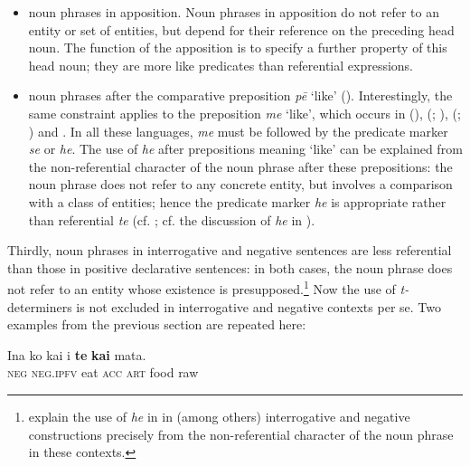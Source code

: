 \begin{itemize}
\item 
noun phrases in apposition. Noun phrases in apposition do not refer to an entity or set of entities, but depend for their reference on the preceding head noun. The function of the apposition is to specify a further property of this head noun; they are more like predicates than referential expressions.

\item 
noun phrases after the comparative preposition \textit{pē} ‘like’ (). Interestingly, the same constraint applies to the preposition \textit{me} ‘like’, which occurs in  (\citealt[136–137]{Cablitz2006}),  (\citealt[53]{Cook1999}; \citealt[156]{ElbertPukui1979}),  (\citealt[237]{Polinsky1992}; \citealt[356]{Bauer1993}) and  \citep[224]{Besnier2000}. In all these languages, \textit{me} must be followed by the predicate marker \textit{se} or \textit{he}. The use of \textit{he} after prepositions meaning ‘like’ can be explained from the non-referential character of the noun phrase after these prepositions: the noun phrase does not refer to any concrete entity, but involves a comparison with a class of entities; hence the predicate marker \textit{he} is appropriate rather than referential \textit{te} (cf. \citealt[236]{Polinsky1992}; cf. the discussion of \textit{he} in ). 

\end{itemize}

Thirdly, noun phrases in interrogative and negative sentences are less referential than those in positive declarative sentences: in both cases, the noun phrase does not refer to an entity whose existence is presupposed.\footnote{\label{fn:254}\citet[437]{ChungMason1995} explain the use of \textit{he} in  in (among others) interrogative and negative constructions precisely from the non-referential character of the noun phrase in these contexts.} Now the use of \textit{t-}determiners is not excluded in interrogative and negative contexts per se. Two examples from the previous section are repeated here:

\ea\label{ex:5.39}
\gll {\ꞌ}Ina ko kai i \textbf{te} \textbf{kai} mata. \\
\textsc{neg} \textsc{neg.ipfv} eat \textsc{acc} \textsc{art} food raw \\

